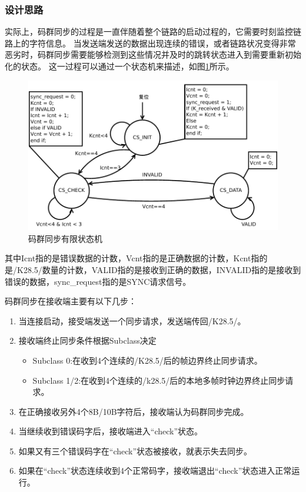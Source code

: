 \documentclass[UTF8]{ctexart}
\begin{document}
\subsubsection{设计思路}

实际上，码群同步的过程是一直伴随着整个链路的启动过程的，它需要时刻监控链路上的字符信息。
当发送端发送的数据出现连续的错误，或者链路状况变得非常恶劣时，码群同步需要能够检测到这些情况并及时的跳转状态进入到需要重新初始化的状态。
这一过程可以通过一个状态机来描述，如图\ref{fig:cgs_fsm}所示。

\begin{figure}[H]
\centering
\includegraphics[width=18cm]{./img/cgs_fsm.pdf}
\caption{码群同步有限状态机}
\label{fig:cgs_fsm}
\end{figure}

其中Icnt指的是错误数据的计数，Vcnt指的是正确数据的计数，Kcnt指的是/K28.5/数量的计数，VALID指的是接收到正确的数据，INVALID指的是接收到错误的数据，sync\_request指的是SYNC请求信号。

码群同步在接收端主要有以下几步：
\begin{enumerate}
	\item 当连接启动，接受端发送一个同步请求，发送端传回/K28.5/。
	\item 接收端终止同步条件根据Subclass决定
		\begin{itemize}
			\item Subclass 0:在收到4个连续的/K28.5/后的帧边界终止同步请求。
			\item Subclass 1/2:在收到4个连续的/k28.5/后的本地多帧时钟边界终止同步请求。
		\end{itemize}
	\item 在正确接收另外4个8B/10B字符后，接收端认为码群同步完成。
	\item 当继续收到错误码字后，接收端进入“check”状态。
	\item 如果又有三个错误码字在“check”状态被接收，就表示失去同步。
	\item 如果在“check”状态连续收到4个正常码字，接收端退出“check”状态进入正常运行。
\end{enumerate}
\end{document}
